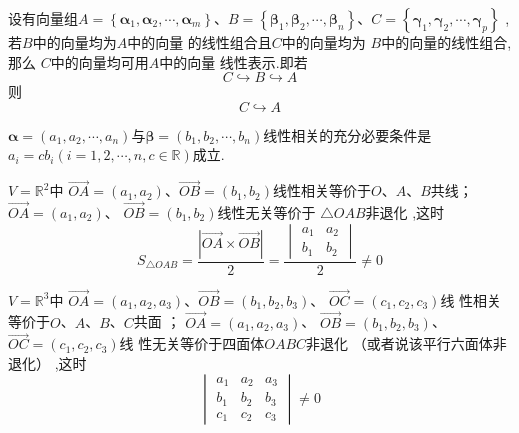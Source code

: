 \begin{formal}
\begin{theorem}[线性组合的传递性]\label{thm:线性组合的传递性}
    设有向量组$A = \left\{
        \bm{\alpha}_1,\bm{\alpha}_2,\cdots,
        \bm{\alpha}_m
    \right\}$、$
    B = \left\{
        \bm{\beta}_1,\bm{\beta}_2,\cdots,
        \bm{\beta}_n
    \right\}$、$C = 
    \left\{\bm{\gamma}_1,\bm{\gamma}_2,\cdots
    ,\bm{\gamma}_p\right\}$
    ,若$B$中的向量均为$A$中的向量
    的线性组合且$C$中的向量均为
    $B$中的向量的线性组合,那么
    $C$中的向量均可用$A$中的向量
    线性表示.即若
    \[
    C\hookrightarrow B \hookrightarrow A
    \]
    则
    \[
    C\hookrightarrow A
    \]
\end{theorem}
\end{formal}
\begin{brown}
\begin{example}
    $\bm{\alpha} = \left(a_1,a_2,
    \cdots,a_n\right)$与$
    \bm{\beta} = \left(b_1,b_2,\cdots,
    b_n\right)$线性相关的充分必要条件是
    $a_i = c b_i(i = 1,2,
    \cdots,n,c \in\mathbb{R})$成立.
\end{example}
\end{brown}
\begin{brown}
\begin{example}
    $V = \mathbb{R}^2$中
    $\overrightarrow{OA} =\left(
        a_1,a_2
    \right)$、$\overrightarrow{OB}=
    \left(b_1,b_2\right)
     $线性相关等价于$O$、$A$、$B$共线；
     $\overrightarrow{OA}
     =\left(a_1,a_2\right) $、
     $\overrightarrow{OB} = \left(b_1
     ,b_2\right)
     $线性无关等价于
     $\bigtriangleup OAB$非退化
     ,这时
     \[
     S_{\bigtriangleup OAB} =
     \frac{\left|\overrightarrow{OA}
     \times \overrightarrow{OB} \right|
     }{2} = \frac{
        \begin{vmatrix}
            a_1 & a_2 \\
            b_1 & b_2
        \end{vmatrix}
     }{2}
     \neq 0
     \]

     $V = \mathbb{R}^3$中
    $\overrightarrow{OA} =\left(
        a_1,a_2,a_3
    \right)$、$\overrightarrow{OB}=
    \left(b_1,b_2,b_3\right)
     $、
     $\overrightarrow{OC} = 
     \left(c_1,c_2,c_3\right) $线
     性相关等价于$O$、$A$、$B$、$C$共面
     ；
     $\overrightarrow{OA}
     =\left(a_1,a_2,a_3\right) $、
     $\overrightarrow{OB} = \left(b_1
     ,b_2,b_3\right)
     $、$
     \overrightarrow{OC} = 
     \left(c_1,c_2,c_3\right) $线
     性无关等价于四面体$ OABC$非退化
     （或者说该平行六面体非退化）
     ,这时
     \[
        \begin{vmatrix}
            a_1 & a_2 & a_3 \\
            b_1 & b_2 & b_3 \\
            c_1 & c_2 & c_3
        \end{vmatrix}
     \neq 0
     \]
\end{example}\end{brown}
